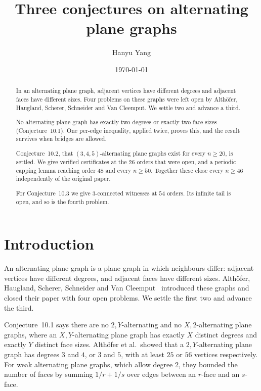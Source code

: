 \documentclass[11pt,a4paper]{amsart}
\theoremstyle{plain}
\theoremstyle{definition}
\begin{document}
\title[Three conjectures on alternating plane graphs]
      {Three conjectures on alternating plane graphs}

\author{Hanyu Yang}

\date{\today}


\begin{abstract}
In an alternating plane graph, adjacent vertices have different degrees and
adjacent faces have different sizes. Four problems on these graphs were left
open by Alth\"ofer, Haugland, Scherer, Schneider and Van Cleemput. We settle two
and advance a third.

No alternating plane graph has exactly two degrees or exactly two face sizes
(Conjecture~10.1). One per-edge inequality, applied twice, proves this, and the
result survives when bridges are allowed.

Conjecture~10.2, that $(3,4,5)$-alternating plane graphs exist for every
$n \ge 20$, is settled. We give verified certificates at the $26$ orders that
were open, and a periodic capping lemma reaching order $48$ and every
$n \ge 50$. Together these close every $n \ge 46$ independently of the original
paper.

For Conjecture~10.3 we give $3$-connected witnesses at $54$ orders. Its
infinite tail is open, and so is the fourth problem.
\end{abstract}

\maketitle

\section{Introduction}

An alternating plane graph is a plane graph in which neighbours differ: adjacent
vertices have different degrees, and adjacent faces have different sizes.
Alth\"ofer, Haugland, Scherer, Schneider and Van Cleemput~\cite{AHSSV2015}
introduced these graphs and closed their paper with four open problems. We
settle the first two and advance the third.

Conjecture~10.1 says there are no $2,Y$-alternating and no $X,2$-alternating
plane graphs, where an $X,Y$-alternating plane graph has exactly $X$ distinct
degrees and exactly $Y$ distinct face sizes. Alth\"ofer et al.\ showed that a
$2,Y$-alternating plane graph has degrees $3$ and $4$, or $3$ and $5$, with at
least $25$ or $56$ vertices respectively. For weak
alternating plane graphs, which allow degree $2$, they bounded the number of
faces by summing $1/r+1/s$ over edges between an $r$-face and an $s$-face.
\end{document}
